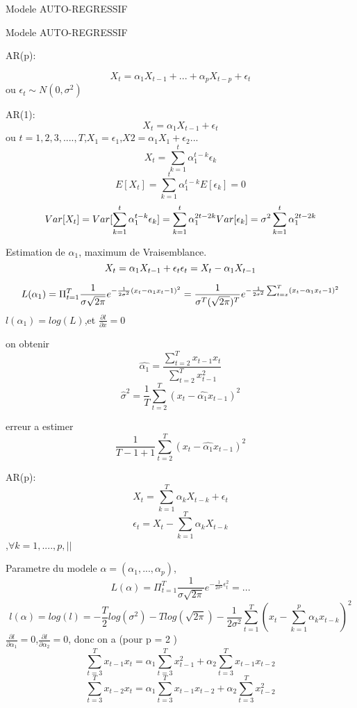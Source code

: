 \documentclass[a4paper]{article}
\begin{document}
\hypersetup{pageanchor=false,
             bookmarksnumbered=true,
             pdfencoding=unicode
            }
\begin{titlepage}
\begin{center}
Modele AUTO-REGRESSIF 
\end{center}
Modele AUTO-REGRESSIF 

\end{titlepage}
\tableofcontents{\LARGE}
\hypersetup{pageanchor=true}


\newpage

AR(p):

$$ 
X_t=\alpha_1X_{t-1}+...+\alpha_pX_{t-p}+\epsilon_t 
$$
ou
$\epsilon_t  \sim N(0,\sigma^2)$


AR(1):
$$ 
X_t=\alpha_1X_{t-1}+\epsilon_t 
$$
ou
$t=1,2,3,....,T$,$X_1=\epsilon_1$,$X2=\alpha_1X_1+\epsilon_2 $...
$$X_t=\sum_{k=1}^t \alpha^{t-k}_1\epsilon_k $$
$$E[X_t]=\sum_{k=1}^t \alpha^{t-k}_1 E[\epsilon_k] =0$$
$$Var[X_t]=Var[\sum_{k=1}^t \alpha^{t-k}_1\epsilon_k] \\
=\sum_{k=1}^t \alpha^{2t-2k}_1 Var[ \epsilon_k] \\
=\sigma^2 \sum_{k=1}^t \alpha^{2t-2k}_1$$

Estimation de $\alpha_1$, maximum de Vraisemblance.
$$X_t=\alpha_1X_{t-1}+\epsilon_t \\
\epsilon_t=X_t-\alpha_1X_{t-1}$$

$$L(\alpha_1)=\Pi_{t=1}^T \frac{1}{\sigma \sqrt{2\pi}} e^{-\frac{1}{2\sigma^2}(x_t-\alpha_1x_t-1)^2} \\
=\frac{1}{\sigma^T (\sqrt{2\pi})^T} e^{-\frac{1}{2\sigma^2} \sum_{t=x}^T(x_t-\alpha_1x_t-1)^2} 
$$
$l(\alpha_1)=log(L)$,et $\frac{\partial l}{\partial x}=0$

on obtenir
$$\hat{\alpha_1}=\frac{\sum_{t=2}^Tx_{t-1}x_t}{\sum_{t=2}^Tx_{t-1}^2}$$
$$\hat{\sigma}^2=\frac{1}{T}\sum_{t=2}^T(x_t-\hat{\alpha_1}x_{t-1})^2$$

erreur a estimer
$$\frac{1}{T-1+1}\sum_{t=2}^T(x_t-\hat{\alpha_1}x_{t-1})^2$$












AR(p):
$$X_t=\sum_{k=1}^T\alpha_kX_{t-k}+\epsilon_t$$
$$\epsilon_t=X_t-\sum_{k=1}^T\alpha_kX_{t-k}$$,$\forall k=1,....,p,||$

Parametre du modele
$\alpha=(\alpha_1,...,\alpha_p)$,
$$L(\alpha)=\Pi_{t=1}^T\frac{1}{\sigma\sqrt{2\pi}}e^{-\frac{1}{2\sigma^2}\epsilon_t^2}=...$$
$$l(\alpha)=log(l)=-\frac{T}{2}log(\sigma^2)-Tlog(\sqrt{2\pi})-\frac{1}{2\sigma^2}\sum_{t=1}^T(x_t-\sum_{k=1}^p\alpha_kx_{t-k})^2$$
$\frac{\partial l}{\partial \alpha_1}=0$,$\frac{\partial l}{\partial \alpha_2}=0$,
donc on a (pour p = 2 )
$$\sum^{T}_{t=3}x_{t-1}x_t=\alpha_1\sum^{T}_{t=3}x_{t-1}^2+\alpha_2\sum^{T}_{t=3}x_{t-1}x_{t-2}$$
$$\sum^{T}_{t=3}x_{t-2}x_t=\alpha_1\sum^{T}_{t=3}x_{t-1}x_{t-2}+\alpha_2\sum^{T}_{t=3}x_{t-2}^2$$
\end{document}

